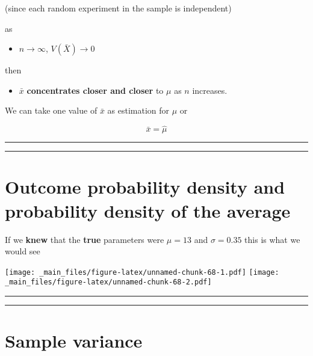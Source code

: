 \documentclass[
]{book}
\providecommand{\tightlist}{%
  \setlength{\itemsep}{0pt}\setlength{\parskip}{0pt}}
\begin{document}
(since each random experiment in the sample is independent)

as

\begin{itemize}
\tightlist
\item
  \(n \rightarrow \infty\), \(V(\bar{X}) \rightarrow 0\)
\end{itemize}

then

\begin{itemize}
\tightlist
\item
  \(\bar{x}\) \textbf{concentrates closer and closer} to \(\mu\) as \(n\) increases.
\end{itemize}

We can take one value of \(\bar{x}\) as estimation for \(\mu\) or

\[\bar{x}=\hat{\mu}\]

\begin{center}\rule{0.5\linewidth}{0.5pt}\end{center}

\begin{center}\rule{0.5\linewidth}{0.5pt}\end{center}

\hypertarget{outcome-probability-density-and-probability-density-of-the-average}{%
\section{Outcome probability density and probability density of the average}\label{outcome-probability-density-and-probability-density-of-the-average}}

If we \textbf{knew} that the \textbf{true} parameters were \(\mu=13\) and \(\sigma=0.35\) this is what we would see

\texttt{[image: \_main\_files/figure-latex/unnamed-chunk-68-1.pdf]} \texttt{[image: \_main\_files/figure-latex/unnamed-chunk-68-2.pdf]}

\begin{center}\rule{0.5\linewidth}{0.5pt}\end{center}

\begin{center}\rule{0.5\linewidth}{0.5pt}\end{center}

\hypertarget{sample-variance-2}{%
\section{Sample variance}\label{sample-variance-2}}
\end{document}
